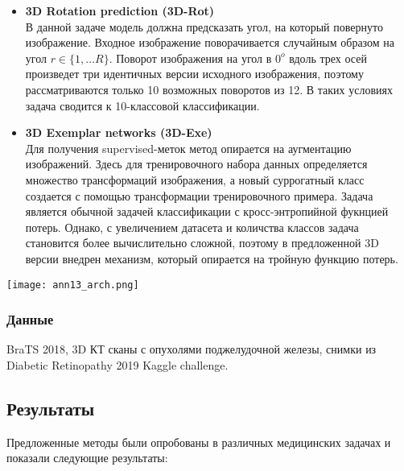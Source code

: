 \begin{itemize}
    \item \textbf{3D Rotation prediction (3D-Rot)} \\
    В данной задаче модель должна предсказать угол, на который повернуто изображение.
    Входное изображение поворачивается случайным образом на угол \(r\in \{1, \dots R\}\).
    Поворот изображения на угол в \(0^{o}\) вдоль трех осей произведет три идентичных версии
    исходного изображения, поэтому рассматриваются только 10 возможных поворотов из 12. 
    В таких условиях задача сводится к 10-классовой классификации.

    \item \textbf{3D Exemplar networks (3D-Exe)} \\
    Для получения supervised-меток метод опирается на аугментацию изображений. 
    Здесь для тренировочного набора данных определяется множество трансформаций 
    изображения, а новый суррогатный класс создается с помощью трансформации тренировочного 
    примера. Задача является обычной задачей классификации с кросс-энтропийной фукнцией потерь.
    Однако, с увеличением датасета и количства классов задача становится более вычислительно сложной, 
    поэтому в предложенной 3D версии внедрен механизм, который опирается на тройную
    функцию потерь.
\end{itemize}


\begin{minipage}{1.0\linewidth}
    \begin{center}
        \texttt{[image: ann13\_arch.png]} 
    \end{center}
    
\end{minipage}

\subsubsection*{Данные}
BraTS 2018, 3D КТ сканы с опухолями поджелудочной железы, снимки из Diabetic Retinopathy 2019 Kaggle
challenge.
\subsection*{Результаты}
 Предложенные методы были опробованы в различных медицинских задачах и показали 
 следующие результаты: 




